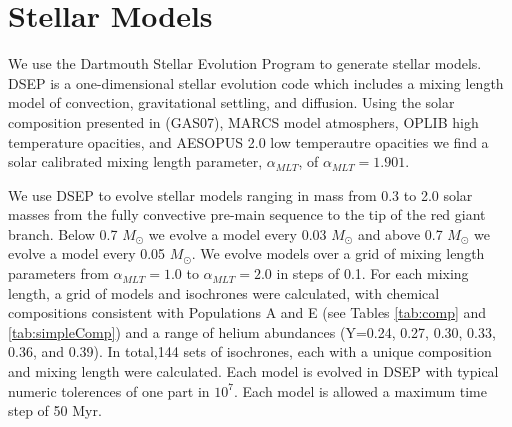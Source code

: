 \section{Stellar Models}\label{sec:modeling}
We use the Dartmouth Stellar Evolution Program \citep[DSEP, ][]{Dotter2008} to
generate stellar models. DSEP is a one-dimensional stellar
evolution code which includes a mixing length model of convection,
gravitational settling, and diffusion. Using the solar composition presented in
\citep{Grevesse2007} (GAS07), MARCS model atmosphers, OPLIB high temperature
opacities, and AESOPUS 2.0 low temperautre opacities we find a solar calibrated
mixing length parameter, $\alpha_{MLT}$, of $\alpha_{MLT} = 1.901$.

We use DSEP to evolve stellar models ranging in mass from 0.3 to 2.0 solar
masses from the fully convective pre-main sequence to the tip of the red giant
branch. Below 0.7 $M_{\odot}$ we evolve a model every 0.03 $M_{\odot}$ and
above 0.7 $M_{\odot}$ we evolve a model every 0.05 $M_{\odot}$. We evolve
models over a grid of mixing length parameters from $\alpha_{MLT} = 1.0$ to
$\alpha_{MLT} = 2.0$ in steps of 0.1. For each mixing length, a grid of models
and isochrones were calculated, with chemical compositions consistent with
Populations A and E (see Tables \ref{tab:comp} and \ref{tab:simpleComp}) and a range of helium abundances
(Y=0.24, 0.27, 0.30, 0.33, 0.36, and 0.39). In total,144 sets of isochrones,
each with a unique composition and mixing length were calculated. Each model is
evolved in DSEP with typical numeric tolerences of one part in $10^{7}$. Each
model is allowed a maximum time step of 50 Myr. 


